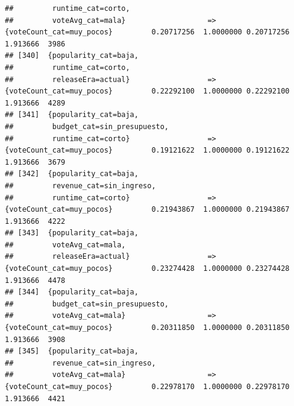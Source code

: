 \documentclass[
]{article}
\begin{document}
\begin{verbatim}
##         runtime_cat=corto,                                                                                                      
##         voteAvg_cat=mala}                   => {voteCount_cat=muy_pocos}         0.20717256  1.0000000 0.20717256 1.913666  3986
## [340]  {popularity_cat=baja,                                                                                                    
##         runtime_cat=corto,                                                                                                      
##         releaseEra=actual}                  => {voteCount_cat=muy_pocos}         0.22292100  1.0000000 0.22292100 1.913666  4289
## [341]  {popularity_cat=baja,                                                                                                    
##         budget_cat=sin_presupuesto,                                                                                             
##         runtime_cat=corto}                  => {voteCount_cat=muy_pocos}         0.19121622  1.0000000 0.19121622 1.913666  3679
## [342]  {popularity_cat=baja,                                                                                                    
##         revenue_cat=sin_ingreso,                                                                                                
##         runtime_cat=corto}                  => {voteCount_cat=muy_pocos}         0.21943867  1.0000000 0.21943867 1.913666  4222
## [343]  {popularity_cat=baja,                                                                                                    
##         voteAvg_cat=mala,                                                                                                       
##         releaseEra=actual}                  => {voteCount_cat=muy_pocos}         0.23274428  1.0000000 0.23274428 1.913666  4478
## [344]  {popularity_cat=baja,                                                                                                    
##         budget_cat=sin_presupuesto,                                                                                             
##         voteAvg_cat=mala}                   => {voteCount_cat=muy_pocos}         0.20311850  1.0000000 0.20311850 1.913666  3908
## [345]  {popularity_cat=baja,                                                                                                    
##         revenue_cat=sin_ingreso,                                                                                                
##         voteAvg_cat=mala}                   => {voteCount_cat=muy_pocos}         0.22978170  1.0000000 0.22978170 1.913666  4421

\end{verbatim}
\end{document}
